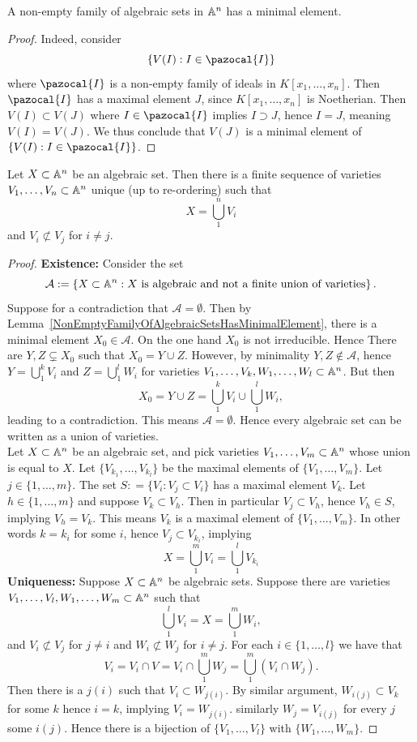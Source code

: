 \begin{lemma}\label{NonEmptyFamilyOfAlgebraicSetsHasMinimalElement}
    A non-empty family of algebraic sets in $\mathbb{A}^n$ has a minimal element.
\end{lemma}
\begin{proof}
    Indeed, consider 
    $$
        \{V(I) : I\in \pazocal{I}\}
    $$
    where $\pazocal{I}$ is a non-empty family of ideals in $K[x_1,\dots,x_n]$. Then $\pazocal{I}$ has a maximal element $J$, since $K[x_1,\dots,x_n]$ is Noetherian. Then $V(I)\subset V(J)$ where $I\in\pazocal{I}$ implies $I\supset J$, hence $I=J$, meaning $V(I)=V(J)$. We thus conclude that $V(J)$ is a minimal element of $\{V(I) : I\in \pazocal{I}\}$. 
\end{proof}
\begin{theorem}
    Let $X\subset \mathbb{A}^n$ be an algebraic set. Then there is a finite sequence of varieties $V_1,\dots,V_n\subset \mathbb{A}^n$ unique (up to re-ordering) such that 
    $$X = \bigcup_1^n V_i$$
    and $V_i \not\subset V_j$ for $i\neq j$. 
\end{theorem}
\begin{proof}
    \textbf{Existence:} Consider the set  
    $$\mathcal{A}:= \left\{ X\subset \mathbb{A}^n : X \text{ is algebraic and not a finite union of varieties} \right\}.$$
    Suppose for a contradiction that $\mathcal{A} = \emptyset$. Then by Lemma~\ref{NonEmptyFamilyOfAlgebraicSetsHasMinimalElement}, there is a minimal element $X_0 \in \mathcal{A}$. On the one hand $X_0$ is not irreducible. Hence There are $Y,Z\subsetneq X_0$ such that $X_0 = Y \cup Z$. However, by minimality $Y,Z\notin \mathcal{A}$, hence $Y= \bigcup_1^k V_i$ and $Z = \bigcup_1^l W_i$ for varieties $V_1,\dots,V_k,W_1,\dots,W_l \subset \mathbb{A}^n$. But then 
    $$X_0 = Y\cup Z = \bigcup_1^k V_i \cup \bigcup_1^l W_i,$$
    leading to a contradiction. This means $\mathcal{A} = \emptyset$. Hence every algebraic set can be written as a union of varieties.\\
    Let $X\subset \mathbb{A}^n$ be an algebraic set, and pick varieties $V_1,\dots,V_m \subset \mathbb{A}^n$ whose union is equal to $X$. Let $\{V_{k_1},\dots,V_{k_l}\}$ be the maximal elements of $\{V_1,\dots,V_m\}$. Let $j\in \{1,\dots,m\}$. The set $S: = \{ V_i : V_j\subset V_i\}$ has a maximal element $V_k$. Let $h\in \{1,\dots,m\}$ and suppose $V_k \subset V_h$. Then in particular $V_j \subset V_h$, hence $V_h\in S$, implying $V_h = V_k$. This means $V_k$ is a maximal element of $\{V_1,\dots,V_m\}$. In other words $k=k_i$ for some $i$, hence $V_j \subset V_{k_i}$, implying 
    $$X= \bigcup_1^m V_i = \bigcup_1^l V_{k_i}$$
    \textbf{Uniqueness:}
    Suppose $X\subset \mathbb{A}^n$ be algebraic sets. Suppose there are varieties $V_1,\dots,V_l,W_1,\dots,W_m\subset \mathbb{A}^n$ such that 
    $$\bigcup_1^l V_i = X = \bigcup_1^m W_i,$$
    and $V_i \not\subset V_j$ for $j\neq i$ and $W_i\not\subset W_j$ for $i\neq j$.
    For each $i\in \{1,\dots,l\}$ we have that
    $$V_i = V_i \cap V = V_i \cap \bigcup_1^m W_j = \bigcup_1^m (V_i\cap W_j).$$
    Then there is a $j(i)$ such that $V_i\subset W_{j(i)}$. By similar argument, $W_{i(j)}\subset V_k$ for some $k$ hence $i=k$, implying $V_i = W_{j(i)}$. similarly $W_j = V_{i(j)}$ for every $j$ some $i(j)$. Hence there is a bijection of $\{V_1,\dots,V_l\}$ with $\{W_1,\dots,W_m\}$.
\end{proof}

